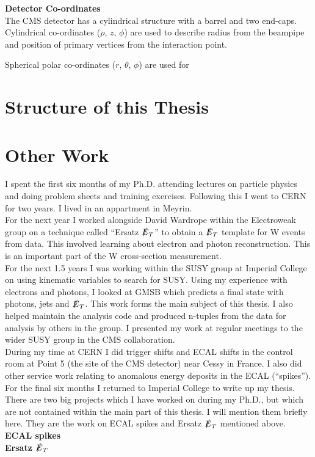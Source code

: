 {\bf Detector Co-ordinates} \\

The CMS detector has a cylindrical structure with a barrel and two end-caps. 
Cylindrical co-ordinates ($\rho$, $z$, $\phi$) are used to describe radius from
the beampipe and position of primary vertices from the interaction point.

Spherical polar co-ordinates ($r$, $\theta$, $\phi$) are used for 

\section{Structure of this Thesis}

\section{Other Work}

I spent the first six months of my Ph.D. attending lectures on particle physics 
and doing problem sheets and training exercises. Following this I went to CERN
for two years. I lived in an appartment in Meyrin. \\

For the next year I worked alongside David Wardrope within the Electroweak group 
on a technique called ``Ersatz $\slashed{E}_{T}$'' to obtain a $\slashed{E}_{T}$ template for W events 
from data. This involved learning about electron and photon reconstruction. This 
is an important part of the W cross-section measurement. \\

For the next 1.5 years I was working within the SUSY group at Imperial College 
on using kinematic variables to search for SUSY. Using my experience with 
electrons and photons, I looked at GMSB which predicts a final state with 
photons, jets and $\slashed{E}_{T}$. This work forms the main subject of this thesis. I
also helped maintain the analysis code and produced n-tuples from the data for
analysis by others in the group. I presented my work at regular meetings to the
wider SUSY group in the CMS collaboration. \\

During my time at CERN I did trigger shifts and ECAL shifts in the control room 
at Point 5 (the site of the CMS detector) near Cessy in France. I also did other
service work relating to anomalous energy deposits in the ECAL (``spikes''). \\

For the final six months I returned to Imperial College to write up my thesis.
\\

There are two big projects which I have worked on during my Ph.D., but which are
not contained within the main part of this thesis. I will mention them briefly
here. They are the work on ECAL spikes and Ersatz $\slashed{E}_{T}$ mentioned above. \\

{\bf ECAL spikes} \\

{\bf Ersatz $\slashed{E}_{T}$} \\
